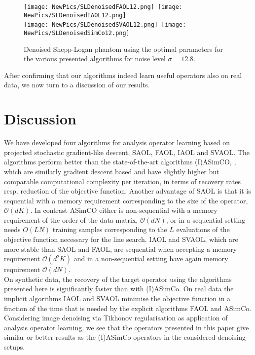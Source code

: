 \documentclass[11pt, onecolumn, journal,compsoc]{IEEEtran}
\newcommand{\Ocal}{\mathcal{O}}
\theoremstyle{plain}
\theoremstyle{remark}
\begin{document}
\begin{figure}
	\centering 
	\texttt{[image: NewPics/SLDenoisedFAOL12.png]}\,
	\texttt{[image: NewPics/SLDenoisedIAOL12.png]}\\
	\texttt{[image: NewPics/SLDenoisedSVAOL12.png]}\,
	\texttt{[image: NewPics/SLDenoisedSimCo12.png]}
	\caption{Denoised Shepp-Logan phantom using the optimal parameters for the various presented algorithms for noise level $\sigma=12.8$.}
	\label{fig:DenoiseSL12}
\end{figure}

After confirming that our algorithms indeed learn useful operators also on real data, we now turn to a discussion of our results.

\section{Discussion}\label{sec:disc}
We have developed four algorithms for analysis operator learning based on projected stochastic gradient-like descent, SAOL, FAOL, IAOL and SVAOL.
The algorithms perform better than the state-of-the-art algorithms (I)ASimCO, \cite{dowadaplha16}, which are similarly gradient descent based and have slightly higher but comparable computational complexity per iteration, in terms of recovery rates resp. reduction of the objective function. Another advantage of SAOL is that it is sequential with a memory requirement corresponding to the size of the operator, $\Ocal(dK)$. In contrast ASimCO either is non-sequential with a memory requirement of the order of the data matrix, $\Ocal(dN)$, or in a sequential setting needs $O(LN)$ training samples corresponding to the $L$ evaluations of the objective function necessary for the line search. IAOL and SVAOL, which are more stable than SAOL and FAOL, are sequential when accepting a memory requirement $\Ocal(d^2K)$ and in a non-sequential setting have again memory requirement $\Ocal(dN)$.\\
On synthetic data, the recovery of the target operator using the algorithms presented here is significantly faster than with (I)ASimCo. On real data the implicit algorithms IAOL and SVAOL minimise the objective function in a fraction of the time that is needed by the explicit algorithms FAOL and ASimCo.
Considering image denoising via Tikhonov regularisation as application of analysis operator learning, we see that the operators presented in this paper give similar or better results as the (I)ASimCo operators in the considered denoising setups. \\
\end{document}
